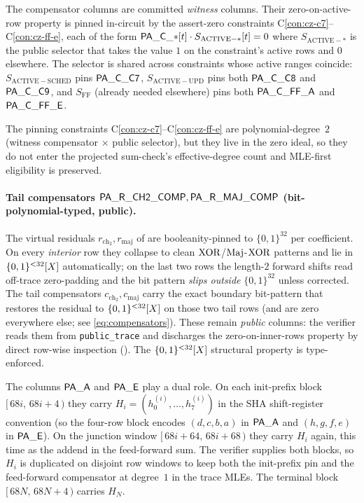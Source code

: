 \begin{remark}
The compensator columns are committed \emph{witness} columns. Their
zero-on-active-row property is pinned in-circuit by the assert-zero
constraints C\ref{con:cz-c7}--C\ref{con:cz-ff-e}, each of the form
$\mathsf{PA\_C\_*}[t] \cdot S_{\mathrm{ACTIVE-*}}[t] = 0$
where $S_{\mathrm{ACTIVE-*}}$ is the public selector that takes the
value $1$ on the constraint's active rows and $0$ elsewhere. The
selector is shared across constraints whose active ranges coincide:
$S_{\mathrm{ACTIVE-SCHED}}$ pins $\mathsf{PA\_C\_C7}$,
$S_{\mathrm{ACTIVE-UPD}}$ pins both $\mathsf{PA\_C\_C8}$ and
$\mathsf{PA\_C\_C9}$, and $S_{\mathrm{FF}}$ (already needed elsewhere)
pins both $\mathsf{PA\_C\_FF\_A}$ and $\mathsf{PA\_C\_FF\_E}$.

The pinning constraints C\ref{con:cz-c7}--C\ref{con:cz-ff-e} are
polynomial-degree~$2$ (witness compensator $\times$ public selector),
but they live in the zero ideal, so they do not enter the projected
sum-check's effective-degree count and MLE-first eligibility is
preserved.

\paragraph{Tail compensators
$\mathsf{PA\_R\_CH2\_COMP}, \mathsf{PA\_R\_MAJ\_COMP}$ (bit-polynomial-typed, public).}
The virtual residuals
$r_{\mathrm{ch}_2}, r_{\mathrm{maj}}$ of  are
booleanity-pinned to $\{0,1\}^{32}$ per coefficient. On every
\emph{interior} row they collapse to clean
$\operatorname{XOR}$/$\operatorname{Maj}$-$\operatorname{XOR}$ patterns and lie in $\{0,1\}^{<32}[X]$
automatically; on the last two rows the length-$2$ forward shifts
read off-trace zero-padding and the bit pattern \emph{slips outside}
$\{0,1\}^{32}$ unless corrected. The tail compensators
$c_{\mathrm{ch}_2}, c_{\mathrm{maj}}$ carry the exact boundary
bit-pattern that restores the residual to $\{0,1\}^{<32}[X]$ on those
two tail rows (and are zero everywhere else; see \eqref{eq:compensators}).
These remain \emph{public} columns: the verifier reads them from
\texttt{public\_trace} and discharges the zero-on-inner-rows property
by direct row-wise inspection (). The
$\{0,1\}^{<32}[X]$ structural property is type-enforced.
\end{remark}

\begin{remark}
\label{rem:boundaries}
The columns $\mathsf{PA\_A}$ and $\mathsf{PA\_E}$ play a dual role.
On each init-prefix block
$[\,68i,\,68i+4\,)$ they carry $H_i = (h_0^{(i)},\dots,h_7^{(i)})$
in the SHA shift-register convention (so the four-row block encodes
$(d,c,b,a)$ in $\mathsf{PA\_A}$ and $(h,g,f,e)$ in $\mathsf{PA\_E}$). On the
junction window $[\,68i+64,\,68i+68\,)$ they carry $H_i$ again, this
time as the addend in the feed-forward sum. The verifier supplies both
blocks, so $H_i$ is duplicated on disjoint row windows to keep both the
init-prefix pin and the feed-forward compensator at degree~$1$ in the
trace MLEs. The terminal block $[\,68N,\,68N+4\,)$ carries $H_N$.
\end{remark}

